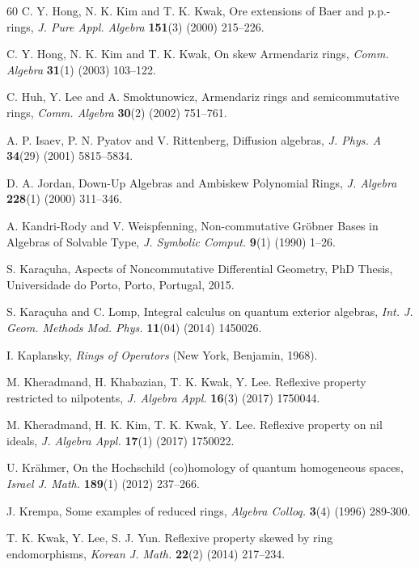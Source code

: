 \documentclass{amsart}
\theoremstyle{definition}
\theoremstyle{remark}
\numberwithin{equation}{section}
\begin{document}
\begin{thebibliography}{60}
 C. Y. Hong, N. K. Kim and T. K. Kwak, Ore extensions of Baer and p.p.-rings, {\em J. Pure Appl. Algebra} {\bf 151}(3) (2000) 215--226.

 C. Y. Hong, N. K. Kim and T. K. Kwak, On skew Armendariz rings, {\em Comm. Algebra} {\bf 31}(1) (2003) 103--122.

 C. Huh, Y. Lee and A. Smoktunowicz, Armendariz rings and semicommutative rings, {\em Comm. Algebra} {\bf 30}(2) (2002) 751--761.

 A. P. Isaev, P. N. Pyatov and V. Rittenberg, Diffusion algebras, {\em J. Phys. A} {\bf 34}(29) (2001) 5815--5834.

 D. A. Jordan, Down-Up Algebras and Ambiskew Polynomial Rings, {\em J. Algebra} {\bf 228}(1) (2000) 311--346.

 A. Kandri-Rody and V. Weispfenning, Non-commutative Gr\"obner Bases in Algebras of Solvable Type, {\em J. Symbolic Comput.} {\bf 9}(1) (1990) 1--26.

 S. Kara\c cuha, Aspects of Noncommutative Differential Geometry, PhD Thesis, Universidade do Porto, Porto, Portugal, 2015.

 S. Kara\c cuha and C. Lomp, Integral calculus on quantum exterior algebras, {\em Int. J. Geom. Methods Mod. Phys.} {\bf 11}(04) (2014) 1450026.

I. Kaplansky, {\em Rings of Operators} (New York, Benjamin, 1968).

 M. Kheradmand, H. Khabazian, T. K. Kwak, Y. Lee. Reflexive property restricted to nilpotents, {\em J. Algebra Appl.} {\bf 16}(3) (2017) 1750044.

 M. Kheradmand, H. K. Kim, T. K. Kwak, Y. Lee. Reflexive property on nil ideals, {\em J. Algebra Appl.} {\bf 17}(1) (2017) 1750022.

 U. Kr\"ahmer, On the Hochschild (co)homology of quantum homogeneous spaces, {\em Israel J. Math.} {\bf 189}(1) (2012) 237--266.

J. Krempa, Some examples of reduced rings, {\em Algebra Colloq.} {\bf 3}(4) (1996) 289-300.

 T. K. Kwak, Y. Lee, S. J. Yun. Reflexive property skewed by ring endomorphisms, {\em Korean J. Math.} {\bf 22}(2) (2014) 217--234.


\end{thebibliography}
\end{document}
